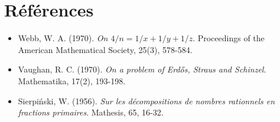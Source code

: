 \documentclass[12pt, a4paper]{article}
\begin{document}
\section*{R\'ef\'erences}
\begin{itemize}
    \item Webb, W. A. (1970). \textit{On $4/n = 1/x + 1/y + 1/z$}. Proceedings of the American Mathematical Society, 25(3), 578-584.
    \item Vaughan, R. C. (1970). \textit{On a problem of Erd\H{o}s, Straus and Schinzel}. Mathematika, 17(2), 193-198.
    \item Sierpi\'nski, W. (1956). \textit{Sur les d\'ecompositions de nombres rationnels en fractions primaires}. Mathesis, 65, 16-32.
\end{itemize}
\end{document}
